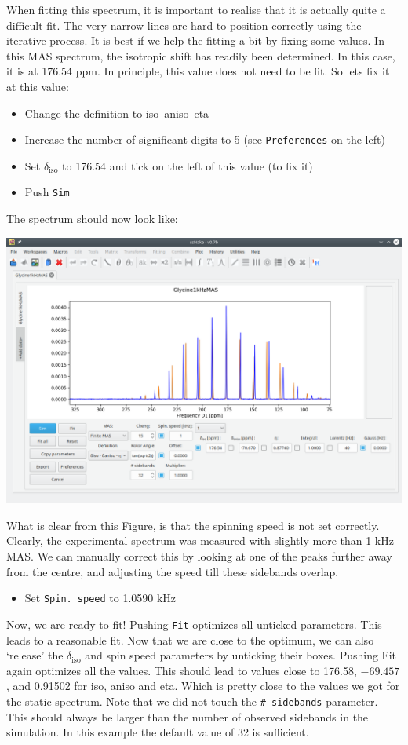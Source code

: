 \documentclass[11pt,a4paper]{article}
\begin{document}
When fitting this spectrum, it is important to realise that it is actually quite a difficult fit.
The very narrow lines are hard to position correctly using the iterative process.
It is best if we help the fitting a bit by fixing some values.
In this MAS spectrum, the isotropic shift has readily been determined.
In this case, it is at 176.54 ppm. In principle, this value does not need to be fit.
So lets fix it at this value:
\begin{itemize}
  \item Change the definition to iso--aniso--eta
  \item Increase the number of significant digits to 5 (see \texttt{Preferences} on the left)
	\item Set $\delta_\text{iso}$ to 176.54 and tick on the left of this value (to fix it)
	 \item Push \texttt{Sim}
\end{itemize}
The spectrum should now look like:
\begin{center}
\includegraphics[width=0.8\linewidth]{Figs/Fig9.png}
\end{center}
What is clear from this Figure, is that the spinning speed is not set correctly.
Clearly, the experimental spectrum was measured with slightly more than 1 kHz MAS.
We can manually correct this by looking at one of the peaks further away from the centre, and adjusting the speed till these sidebands overlap.
\begin{itemize}
  \item Set \texttt{Spin.\ speed} to 1.0590 kHz
\end{itemize}
Now, we are ready to fit!
Pushing \texttt{Fit} optimizes all unticked parameters.
This leads to a reasonable fit.
Now that we are close to the optimum, we can also `release' the $\delta_\text{iso}$ and spin speed parameters by unticking their boxes.
Pushing Fit again optimizes all the values.
This should lead to values close to 176.58, $-69.457$, and 0.91502 for iso, aniso and eta.
Which is pretty close to the values we got for the static spectrum.
Note that we did not touch the \texttt{\# sidebands} parameter.
This should always be larger than the number of observed sidebands in the simulation. In this example the default value of 32 is sufficient.
\end{document}
